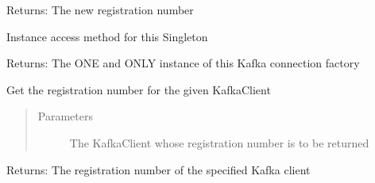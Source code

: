 \documentclass[letterpaper,10pt,english]{sphinxmanual}
\begin{document}
\begin{fulllineitems}
\begin{fulllineitems}
\begin{quote}
\begin{description}
\begin{itemize}
\end{itemize}

\end{description}\end{quote}

\sphinxAtStartPar
Returns: The new registration number

\end{fulllineitems}


\begin{fulllineitems}
\label{\detokenize{Forge:Forge.KafkaConnectionFactory.get_factory}}
\sphinxAtStartPar
Instance access method for this Singleton

\sphinxAtStartPar
Returns: The ONE and ONLY instance of this Kafka connection factory

\end{fulllineitems}


\begin{fulllineitems}
\label{\detokenize{Forge:Forge.KafkaConnectionFactory.get_registration_number}}
\sphinxAtStartPar
Get the registration number for the given KafkaClient
\begin{quote}\begin{description}
\item[{Parameters}] \leavevmode
\sphinxAtStartPar
{} \textendash{} The KafkaClient whose registration number is to be returned

\end{description}\end{quote}

\sphinxAtStartPar
Returns: The registration number of the specified Kafka client

\end{fulllineitems}


\end{fulllineitems}
\end{document}
